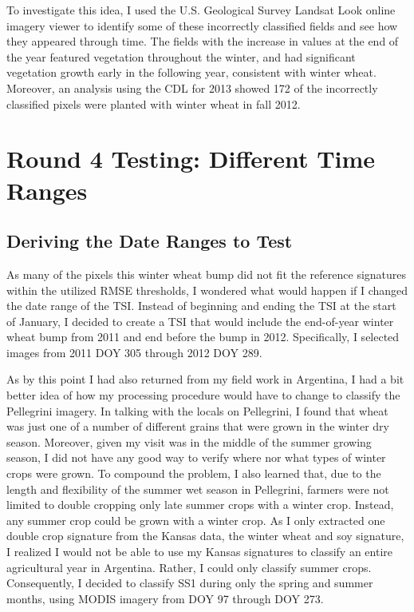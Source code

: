 To investigate this idea, I used the U.S. Geological Survey Landsat Look online imagery viewer to identify some of these incorrectly classified fields and see how they appeared through time. The fields with the increase in values at the end of the year featured vegetation throughout the winter, and had significant vegetation growth early in the following year, consistent with winter wheat. Moreover, an analysis using the CDL for 2013 showed 172 of the incorrectly classified pixels were planted with winter wheat in fall 2012.


\section{Round 4 Testing: Different Time Ranges}
\label{appendix:testing:r4}

\subsection*{Deriving the Date Ranges to Test}

As many of the pixels this winter wheat bump did not fit the reference signatures within the utilized RMSE thresholds, I wondered what would happen if I changed the date range of the TSI. Instead of beginning and ending the TSI at the start of January, I decided to create a TSI that would include the end-of-year winter wheat bump from 2011 and end before the bump in 2012. Specifically, I selected images from 2011 DOY 305 through 2012 DOY 289.


As by this point I had also returned from my field work in Argentina, I had a bit better idea of how my processing procedure would have to change to classify the Pellegrini imagery. In talking with the locals on Pellegrini, I found that wheat was just one of a number of different grains that were grown in the winter dry season. Moreover, given my visit was in the middle of the summer growing season, I did not have any good way to verify where nor what types of winter crops were grown. To compound the problem, I also learned that, due to the length and flexibility of the summer wet season in Pellegrini, farmers were not limited to double cropping only late summer crops with a winter crop. Instead, any summer crop could be grown with a winter crop. As I only extracted one double crop signature from the Kansas data, the winter wheat and soy signature, I realized I would not be able to use my Kansas signatures to classify an entire agricultural year in Argentina. Rather, I could only classify summer crops. Consequently, I decided to classify SS1 during only the spring and summer months, using MODIS imagery from DOY 97 through DOY 273.

